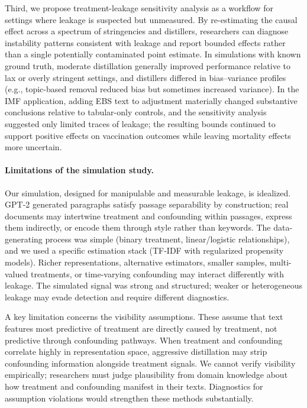 \documentclass[11pt]{article}
\begin{document}
Third, we propose treatment-leakage sensitivity analysis as a workflow for settings where leakage is suspected but unmeasured. By re-estimating the causal effect across a spectrum of stringencies and distillers, researchers can diagnose instability patterns consistent with leakage and report bounded effects rather than a single potentially contaminated point estimate. In simulations with known ground truth, moderate distillation generally improved performance relative to lax or overly stringent settings, and distillers differed in bias--variance profiles (e.g., topic-based removal reduced bias but sometimes increased variance). In the IMF application, adding EBS text to adjustment materially changed substantive conclusions relative to tabular-only controls, and the sensitivity analysis suggested only limited traces of leakage; the resulting bounds continued to support positive effects on vaccination outcomes while leaving mortality effects more uncertain.

\paragraph{Limitations of the simulation study.} Our simulation, designed for manipulable and measurable leakage, is idealized. GPT-2 generated paragraphs satisfy passage separability by construction; real documents may intertwine treatment and confounding within passages, express them indirectly, or encode them through style rather than keywords. The data-generating process was simple (binary treatment, linear/logistic relationships), and we used a specific estimation stack (TF-IDF with regularized propensity models). Richer representations, alternative estimators, smaller samples, multi-valued treatments, or time-varying confounding may interact differently with leakage. The simulated signal was strong and structured; weaker or heterogeneous leakage may evade detection and require different diagnostics.

A key limitation concerns the visibility assumptions. These assume that text features most predictive of treatment are directly caused by treatment, not predictive through confounding pathways. When treatment and confounding correlate highly in representation space, aggressive distillation may strip confounding information alongside treatment signals. We cannot verify visibility empirically; researchers must judge plausibility from domain knowledge about how treatment and confounding manifest in their texts. Diagnostics for assumption violations would strengthen these methods substantially.
\end{document}
